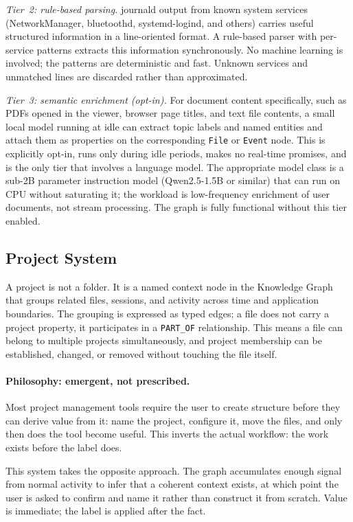 \emph{Tier~2: rule-based parsing.} journald output from known system services
(NetworkManager, bluetoothd, systemd-logind, and others) carries useful
structured information in a line-oriented format. A rule-based parser with
per-service patterns extracts this information synchronously. No machine
learning is involved; the patterns are deterministic and fast. Unknown services
and unmatched lines are discarded rather than approximated.

\emph{Tier~3: semantic enrichment (opt-in).} For document content specifically,
such as PDFs opened in the viewer, browser page titles, and text file contents,
a small local model running at idle can extract topic labels and named entities
and attach them as properties on the corresponding \texttt{File} or \texttt{Event}
node. This is explicitly opt-in, runs only during idle periods, makes no
real-time promises, and is the only tier that involves a language model.
The appropriate model class is a sub-2B parameter instruction model
(Qwen2.5-1.5B or similar) that can run on CPU without saturating it; the
workload is low-frequency enrichment of user documents, not stream processing.
The graph is fully functional without this tier enabled.

\subsection{Project System}
\label{sec:projects}

A project is not a folder. It is a named context node in the Knowledge Graph
that groups related files, sessions, and activity across time and application
boundaries. The grouping is expressed as typed edges; a file does not carry a
project property, it participates in a \texttt{PART\_OF} relationship. This
means a file can belong to multiple projects simultaneously, and project
membership can be established, changed, or removed without touching the file
itself.

\paragraph{Philosophy: emergent, not prescribed.}
Most project management tools require the user to create structure before they
can derive value from it: name the project, configure it, move the files, and
only then does the tool become useful. This inverts the actual workflow: the
work exists before the label does.

This system takes the opposite approach. The graph accumulates enough signal
from normal activity to infer that a coherent context exists, at which point
the user is asked to confirm and name it rather than construct it from scratch.
Value is immediate; the label is applied after the fact.

